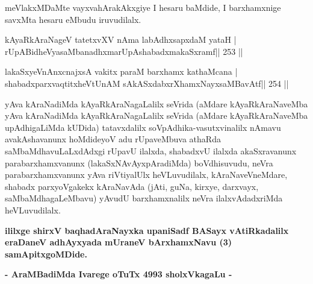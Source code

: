 \begin{artha}
meVlakxMDaMte vayxvahArakAkxgiye I hesaru baMdide, I barxhamxnige
savxMta hesaru eMbudu iruvudilalx. 
\end{artha}


\begin{shl}
kAyaRkAraNageV tatetxvXV nAma labAdhxsapxdaM yataH |
rUpABidheVyasaMbanadhxmarUpAshabadxmakaSxramf\hfill || 253 ||
\end{shl}

\begin{shl}
lakaSxyeVnAnxcnajxsA vakitx paraM barxhamx kathaMcana |
shabadxparxvaqtitxheVtUnAM sAkASxdabxrXhamxNayxsaMBavAtf\hfill || 254 ||
\end{shl}

\begin{artha}
yAva kAraNadiMda kAyaRkAraNagaLalilx seVrida (aMdare kAyaRkAraNaveMba
yAva kAraNadiMda kAyaRkAraNagaLalilx seVrida (aMdare kAyaRkAraNaveMba
upAdhigaLiMda kUDida) tatavxdalilx soVpAdhika-vasutxvinalilx nAmavu
avakAshavanunx hoMdideyoV adu rUpaveMbuva athaRda
saMbaMdhavuLaLxdAdxgi rUpavU ilalxda, shabadxvU ilalxda akaSxravanunx
parabarxhamxvanunx (lakaSxNAvAyxpAradiMda) boVdhisuvudu, neVra
parabarxhamxvanunx yAva riVtiyalUlx heVLuvudilalx, kAraNaveVneMdare,
shabadx parxyoVgakekx kAraNavAda (jAti, guNa, kirxye, darxvayx,
saMbaMdhagaLeMbavu) yAvudU barxhamxnalilx neVra ilalxvAdadxriMda
heVLuvudilalx.
\end{artha}

\begin{center}
\textbf{ililxge shirxV baqhadAraNayxka upaniSadf BASayx vAtiRkadalilx eraDaneV
adhAyxyada mUraneV bArxhamxNavu (3) samApitxgoMDide.}
\end{center}

\begin{center}
\textbf{- AraMBadiMda Ivarege oTuTx 4993 sholxVkagaLu -}
\end{center}

